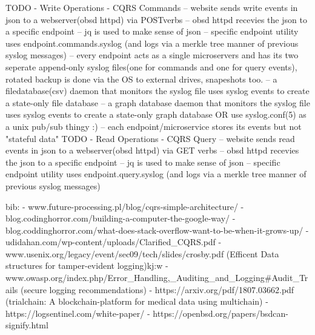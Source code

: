 TODO
- Write Operations - CQRS Commands
-- website sends write events in json to a webserver(obsd httpd) via POST\PUT verbs
-- obsd httpd recevies the json to a specific endpoint 
-- jq is used to make sense of json
-- specific endpoint utility uses endpoint.commands.syslog (and logs via a merkle tree manner of previous syslog messages)
-- every endpoint acts as a single microservers and has its two seperate append-only syslog files(one for commands and one for query events), rotated backup is done via the OS to external drives, snapeshots too. 
-- a filedatabase(csv) daemon that monitors the syslog file uses syslog events to create a state-only file database 
-- a graph database daemon that monitors the syslog file uses syslog events to create a state-only graph database
OR use 	syslog.conf(5) as a unix pub/sub thingy :)
-- each endpoint/microservice stores its events but not "stateful data" 
TODO
- Read Operations - CQRS Query
-- website sends read events in json to a webserver(obsd httpd) via GET verbs
-- obsd httpd recevies the json to a specific endpoint 
-- jq is used to make sense of json
-- specific endpoint utility uses endpoint.query.syslog (and logs via a merkle tree manner of previous syslog messages)

bib:
- www.future-processing.pl/blog/cqrs-simple-architecture/
- blog.codinghorror.com/building-a-computer-the-google-way/
- blog.coddinghorror.com/what-does-stack-overflow-want-to-be-when-it-grows-up/
- udidahan.com/wp-content/uploads/Clarified_CQRS.pdf
- www.usenix.org/legacy/event/sec09/tech/slides/crosby.pdf (Efficent Data structures for tamper-evident logging)kj:w
- www.owasp.org/index.php/Error_Handling,_Auditing_and_Logging#Audit_Trails (secure logging recommendations) 
- https://arxiv.org/pdf/1807.03662.pdf (trialchain: A blockchain-platform for medical data using multichain)
- https://logsentinel.com/white-paper/
- https://openbsd.org/papers/bsdcan-signify.html
